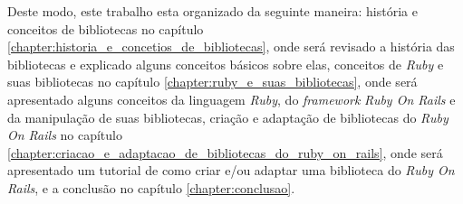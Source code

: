 Deste modo, este trabalho esta organizado da seguinte maneira: história e conceitos de
bibliotecas no capítulo \ref{chapter:historia_e_concetios_de_bibliotecas}, onde será
revisado a história das bibliotecas e explicado alguns conceitos básicos sobre elas,
conceitos de \emph{Ruby} e suas bibliotecas no capítulo \ref{chapter:ruby_e_suas_bibliotecas},
onde será apresentado alguns conceitos da linguagem \emph{Ruby}, do \emph{framework}
\emph{Ruby On Rails} e da manipulação de suas bibliotecas, criação e adaptação
de bibliotecas do \emph{Ruby On Rails} no capítulo 
\ref{chapter:criacao_e_adaptacao_de_bibliotecas_do_ruby_on_rails}, onde será apresentado um tutorial
de como criar e/ou adaptar uma biblioteca do \emph{Ruby On Rails}, e a conclusão no
capítulo \ref{chapter:conclusao}.